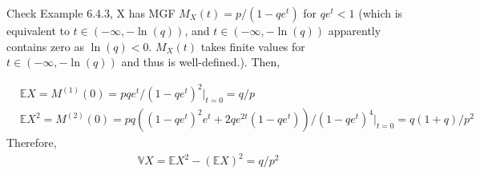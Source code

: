 
\setcounter{theorem}{17}
\begin{exercise} [BH.6.18]
\begin{solution}
    Check Example 6.4.3, X has MGF $M_X(t)= p/(1-qe^t)$ for $qe^t<1$ (which is equivalent to $t\in (-\infty, -\ln(q)) $, and $t\in (-\infty, -\ln(q)) $ apparently contains zero as $\ln(q)<0$. $M_X(t)$ takes finite values for $t\in (-\infty, -\ln(q)) $ and thus is well-defined.). Then,

    \begin{align*}
    	&\mathbb{E}X =M^{(1)}(0) = pqe^t/(1-qe^t)^2|_{t=0} = q/p\\	&\mathbb{E}X^2 =M^{(2)}(0) = pq\left((1-qe^t)^2e^t +2qe^{2t}(1-qe^t) \right)/(1-qe^t)^4|_{t=0} = q(1+q)/p^2
    \end{align*}
    Therefore,
    \begin{align*}
    	\mathbb{V} X = \mathbb{E}X^2 - (\mathbb{E}X)^2 = q/p^2
    \end{align*}
\end{solution}
\end{exercise}

